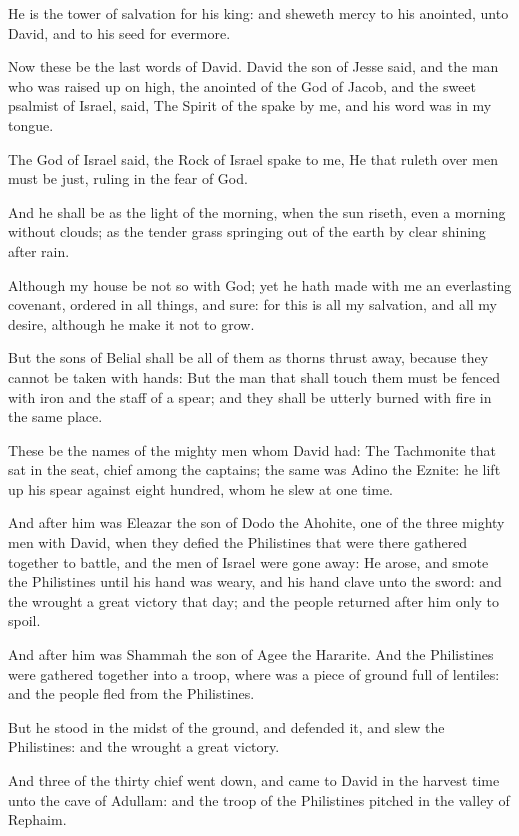 \Verse He is the tower of salvation for his king: and sheweth mercy to his anointed, unto David, and to his seed for evermore.


\Chapter
\Verse Now these be the last words of David. David the son of Jesse said, and the man who was raised up on high, the anointed of the God of Jacob, and the sweet psalmist of Israel, said, \Verse The Spirit of the \LORD spake by me, and his word was in my tongue.

\Verse The God of Israel said, the Rock of Israel spake to me, He that ruleth over men must be just, ruling in the fear of God.

\Verse And he shall be as the light of the morning, when the sun riseth, even a morning without clouds; as the tender grass springing out of the earth by clear shining after rain.

\Verse Although my house be not so with God; yet he hath made with me an everlasting covenant, ordered in all things, and sure: for this is all my salvation, and all my desire, although he make it not to grow.

\Verse But the sons of Belial shall be all of them as thorns thrust away, because they cannot be taken with hands: \Verse But the man that shall touch them must be fenced with iron and the staff of a spear; and they shall be utterly burned with fire in the same place.

\Verse These be the names of the mighty men whom David had: The Tachmonite that sat in the seat, chief among the captains; the same was Adino the Eznite: he lift up his spear against eight hundred, whom he slew at one time.

\Verse And after him was Eleazar the son of Dodo the Ahohite, one of the three mighty men with David, when they defied the Philistines that were there gathered together to battle, and the men of Israel were gone away: \Verse He arose, and smote the Philistines until his hand was weary, and his hand clave unto the sword: and the \LORD wrought a great victory that day; and the people returned after him only to spoil.

\Verse And after him was Shammah the son of Agee the Hararite. And the Philistines were gathered together into a troop, where was a piece of ground full of lentiles: and the people fled from the Philistines.

\Verse But he stood in the midst of the ground, and defended it, and slew the Philistines: and the \LORD wrought a great victory.

\Verse And three of the thirty chief went down, and came to David in the harvest time unto the cave of Adullam: and the troop of the Philistines pitched in the valley of Rephaim.

